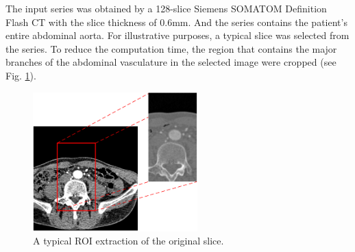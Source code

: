 The input series was obtained by a 128-slice Siemens SOMATOM Definition Flash CT with the slice thickness of 0.6mm.
And the series contains the patient's entire abdominal aorta.
For illustrative purposes, a typical slice was selected from the series.
To reduce the computation time, the region that contains the major branches of the abdominal vasculature in the selected image were cropped (see Fig. \ref{fig_roi}).
\begin{figure}[tb]
\centering
\includegraphics[width=2.5in]{Figures/ROI.png}
\caption{A typical ROI extraction of the original slice.}
\label{fig_roi}
\end{figure}

